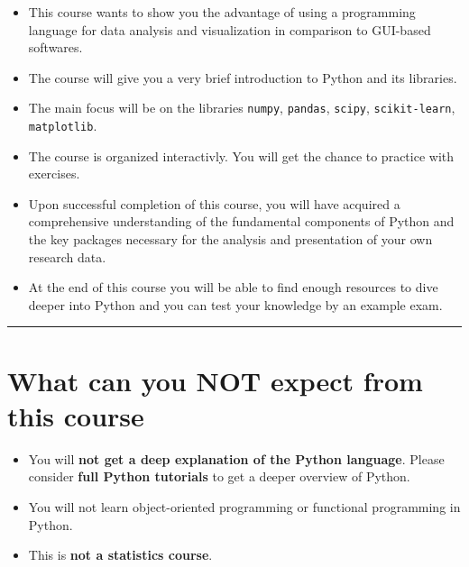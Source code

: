 \documentclass[
  letterpaper,
  DIV=11,
  numbers=noendperiod]{scrreprt}
\providecommand{\tightlist}{%
  \setlength{\itemsep}{0pt}\setlength{\parskip}{0pt}}\usepackage{longtable,booktabs,array}
\begin{document}

\begin{itemize}
\tightlist
\item
  This course wants to show you the advantage of using a programming
  language for data analysis and visualization in comparison to
  GUI-based softwares.
\item
  The course will give you a very brief introduction to Python and its
  libraries.
\item
  The main focus will be on the libraries \texttt{numpy},
  \texttt{pandas}, \texttt{scipy}, \texttt{scikit-learn},
  \texttt{matplotlib}.
\item
  The course is organized interactivly. You will get the chance to
  practice with exercises.
\item
  Upon successful completion of this course, you will have acquired a
  comprehensive understanding of the fundamental components of Python
  and the key packages necessary for the analysis and presentation of
  your own research data.
\item
  At the end of this course you will be able to find enough resources to
  dive deeper into Python and you can test your knowledge by an example
  exam.
\end{itemize}

\begin{center}\rule{0.5\linewidth}{0.5pt}\end{center}

\section*{What can you NOT expect from this
course}\label{what-can-you-not-expect-from-this-course}


\begin{itemize}
\tightlist
\item
  You will \textbf{not get a deep explanation of the Python language}.
  Please consider \textbf{full Python tutorials} to get a deeper
  overview of Python.
\item
  You will not learn object-oriented programming or functional
  programming in Python.
\item
  This is \textbf{not a statistics course}.
\end{itemize}
\end{document}
